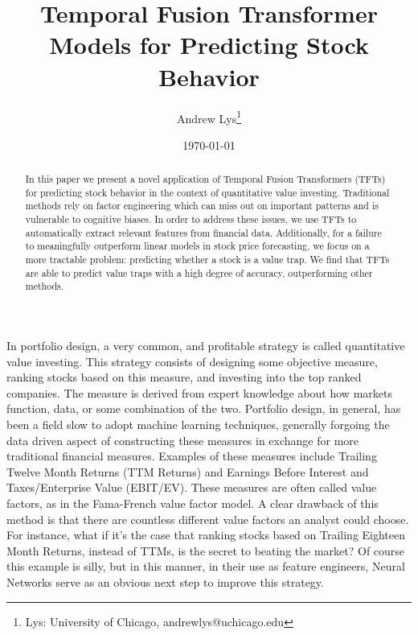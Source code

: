 \documentclass[AER]{AEA}
\begin{document}
\title{Temporal Fusion Transformer Models for Predicting Stock Behavior}
\author{Andrew Lys\thanks{Lys: University of Chicago, andrewlys@uchicago.edu}}
\date{\today}
\JEL{}
\Keywords{}

\begin{abstract}
In this paper we present a novel application of Temporal Fusion Transformers (TFTs) for predicting stock behavior in the context of quantitative value investing.
Traditional methods rely on factor engineering which can miss out on important patterns and is vulnerable to cognitive biases.
In order to address these issues, we use TFTs to automatically extract relevant features from financial data.
Additionally, for a failure to meaningfully outperform linear models in stock price forecasting, we focus on a more tractable problem: predicting whether a stock is a value trap.
We find that TFTs are able to predict value traps with a high degree of accuracy, outperforming other methods.
\end{abstract}


\maketitle
In portfolio design, a very common, and profitable strategy is called quantitative value investing. 
This strategy consists of designing some objective measure, ranking stocks based on this measure, and investing into the top ranked 
companies. The measure is derived from expert knowledge about how markets function, data, or some combination 
of the two. Portfolio design, in general, has been a field slow to adopt machine learning techniques, generally 
forgoing the data driven aspect of constructing these measures in exchange for more traditional financial 
measures. Examples of these measures include Trailing Twelve Month Returns (TTM Returns) and Earnings Before 
Interest and Taxes/Enterprise Value (EBIT/EV). These measures are often called value factors, as in the 
Fama-French value factor model. A clear drawback of this method is that there are countless different value 
factors an analyst could choose. For instance, what if it's  the case that ranking stocks based on Trailing 
Eighteen Month Returns, instead of TTMs, is the secret to beating the market? Of course this example is silly, 
but in this manner, in their use as feature engineers, Neural Networks serve as an obvious next step to improve 
this strategy.
\end{document}
